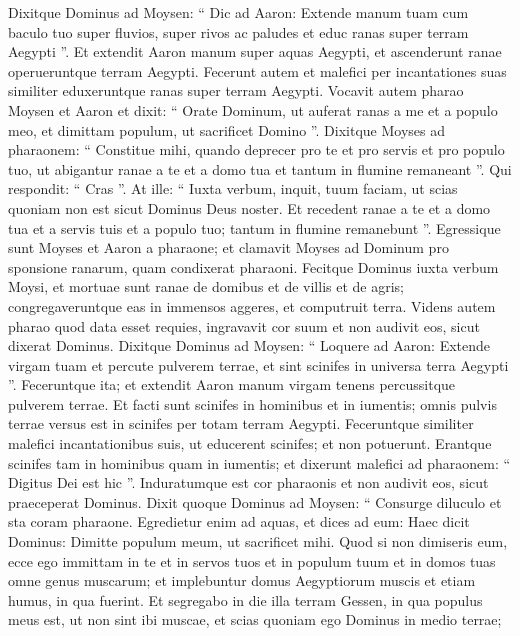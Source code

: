 \begin{biblechapter}
\begin{biblechapter}
\begin{biblechapter}
\begin{biblechapter}
\begin{biblechapter}
\begin{biblechapter}
\begin{biblechapter}
\begin{biblechapter}
\verse Dixitque Dominus ad Moysen: “ Dic ad Aaron: Extende manum tuam cum baculo tuo super fluvios, super rivos ac paludes et educ ranas super terram Aegypti ”. 
\verse Et extendit Aaron manum super aquas Aegypti, et ascenderunt ranae operueruntque terram Aegypti. 
\verse Fecerunt autem et malefici per incantationes suas similiter eduxeruntque ranas super terram Aegypti.
 \verse Vocavit autem pharao Moysen et Aaron et dixit: “ Orate Dominum, ut auferat ranas a me et a populo meo, et dimittam populum, ut sacrificet Domino ”. 
\verse Dixitque Moyses ad pharaonem: “ Constitue mihi, quando deprecer pro te et pro servis et pro populo tuo, ut abigantur ranae a te et a domo tua et tantum in flumine remaneant ”. 
\verse Qui respondit: “ Cras ”. At ille: “ Iuxta verbum, inquit, tuum faciam, ut scias quoniam non est sicut Dominus Deus noster. 
\verse Et recedent ranae a te et a domo tua et a servis tuis et a populo tuo; tantum in flumine remanebunt ”. 
\verse Egressique sunt Moyses et Aaron a pharaone; et clamavit Moyses ad Dominum pro sponsione ranarum, quam condixerat pharaoni. 
 \verse Fecitque Dominus iuxta verbum Moysi, et mortuae sunt ranae de domibus et de villis et de agris; 
\verse congregaveruntque eas in immensos aggeres, et computruit terra. 
\verse Videns autem pharao quod data esset requies, ingravavit cor suum et non audivit eos, sicut dixerat Dominus.
 \verse Dixitque Dominus ad Moysen: “ Loquere ad Aaron: Extende virgam tuam et percute pulverem terrae, et sint scinifes in universa terra Aegypti ”. 
\verse Feceruntque ita; et extendit Aaron manum virgam tenens percussitque pulverem terrae. Et facti sunt scinifes in hominibus et in iumentis; omnis pulvis terrae versus est in scinifes per totam terram Aegypti.
 \verse Feceruntque similiter malefici incantationibus suis, ut educerent scinifes; et non potuerunt. Erantque scinifes tam in hominibus quam in iumentis; 
\verse et dixerunt malefici ad pharaonem: “ Digitus Dei est hic ”. Induratumque est cor pharaonis et non audivit eos, sicut praeceperat Dominus.
 \verse Dixit quoque Dominus ad Moysen: “ Consurge diluculo et sta coram pharaone. Egredietur enim ad aquas, et dices ad eum: Haec dicit Dominus: Dimitte populum meum, ut sacrificet mihi. 
\verse Quod si non dimiseris eum, ecce ego immittam in te et in servos tuos et in populum tuum et in domos tuas omne genus muscarum; et implebuntur domus Aegyptiorum muscis et etiam humus, in qua fuerint. 
\verse Et segregabo in die illa terram Gessen, in qua populus meus est, ut non sint ibi muscae, et scias quoniam ego Dominus in medio terrae; 

\end{biblechapter}
\end{biblechapter}
\end{biblechapter}
\end{biblechapter}
\end{biblechapter}
\end{biblechapter}
\end{biblechapter}
\end{biblechapter}
